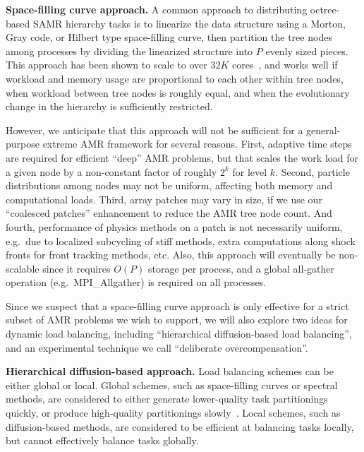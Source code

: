\documentclass[11pt,letterpaper]{article}
\newcommand{\code}[1]{\textsf{#1}}
\begin{document}
\textbf{Space-filling curve approach.}  A common approach to
distributing octree-based SAMR hierarchy tasks is to linearize the
data structure using a Morton, Gray code, or Hilbert type
space-filling curve, then partition the tree nodes among processes by
dividing the linearized structure into $P$ evenly sized pieces.  This
approach has been shown to scale to over $32K$ cores~\cite{BuGh08},
and works well if workload and memory usage are proportional to each
other within tree nodes, when workload between tree nodes is roughly
equal, and when the evolutionary change in the hierarchy is
sufficiently restricted.

However, we anticipate that this approach will not be sufficient for a
general-purpose extreme AMR framework for several reasons.
%
First, adaptive time steps are required for efficient ``deep'' AMR
problems, but that scales the work load for a given node by a
non-constant factor of roughly $2^k$ for level $k$.
%
Second, particle distributions among nodes may not be uniform, affecting both memory and computational loads.
%
Third, array patches may vary in size, if we use our ``coalesced
patches'' enhancement to reduce the AMR tree node count.
%
And fourth, performance of physics methods on a patch is not
necessarily uniform, e.g.~due to localized subcycling of stiff
methods, extra computations along shock fronts for front tracking
methods, etc.  
%
Also, this approach will eventually be non-scalable since it
requires $O(P)$ storage per process, and a global all-gather
operation (e.g.~\code{MPI\_Allgather}) is required on all processes.

Since we suspect that a space-filling curve approach is only effective
for a strict subset of AMR problems we wish to support, we will also
explore two ideas for dynamic load balancing, including ``hierarchical
diffusion-based load balancing'', and an experimental technique we
call ``deliberate overcompensation''.

\textbf{Hierarchical diffusion-based approach.} Load balancing
schemes can be either global or local.  Global schemes, such as
space-filling curves or spectral methods, are considered to either
generate lower-quality task partitionings quickly, or produce
high-quality partitionings slowly~\cite{ScKa97}.  Local schemes,
such as diffusion-based methods, are considered to be efficient
at balancing tasks locally, but cannot effectively balance tasks
globally.
\end{document}
